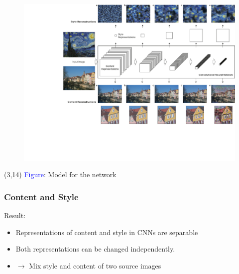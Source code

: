 \documentclass{beamer} %
\begin{document}
\begin{frame}

\begin{figure}[h]
\centering
{\includegraphics[width=1\columnwidth]{figures/network_model}} \quad


\end{figure}
\begin{textblock}{10}(3,14)
	\textcolor{blue}{Figure}: Model for the network \cite{Paper1}
 \end{textblock} 


\end{frame}

\begin{frame}
\frametitle{Content and Style}
Result:
\begin{itemize}
\item  Representations of content and style in CNNs are separable
\pause
\item Both representations can be changed independently.
\pause
\item $\longrightarrow$ Mix style and content of two source images 
\end{itemize}

\end{frame}
\end{document}
